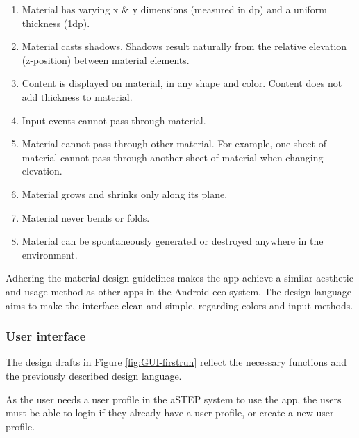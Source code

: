 \begin{enumerate}
	\item Material has varying x \& y dimensions (measured in dp) and a uniform thickness (1dp).
	\item Material casts shadows. Shadows result naturally from the relative elevation (z-position) between material elements.
	\item Content is displayed on material, in any shape and color. Content does not add thickness to material.
	\item Input events cannot pass through material.
	\item Material cannot pass through other material. For example, one sheet of material cannot pass through another sheet of material when changing elevation.
	\item Material grows and shrinks only along its plane.
	\item Material never bends or folds.
	\item Material can be spontaneously generated or destroyed anywhere in the environment.
\end{enumerate} 

Adhering the material design guidelines makes the app achieve a similar aesthetic and usage method as other apps in the Android eco-system. 
The design language aims to make the interface clean and simple, regarding colors and input methods.

\subsubsection{User interface}
The design drafts in Figure \ref{fig:GUI-firstrun} reflect the necessary functions and the previously described design language. 

As the user needs a user profile in the aSTEP system to use the app, the users must be able to login if they already have a user profile, or create a new user profile.

